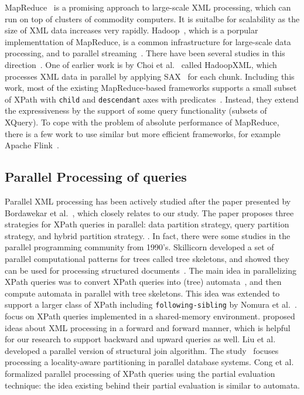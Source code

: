 MapReduce~\cite{DeGh04} is a promising approach to large-scale XML processing,
which can run on top of clusters of commodity computers. It is suitalbe for
scalability as the size of XML data increases very rapidly.
Hadoop~\cite{HadoopWhit12}, which is a porpular implementtation of MapReduce, is
a common infrastructure for large-scale data processing, and to parallel
streaming~\cite{OgTP13,LiZZ17}. There have been several studies in this
direction~\cite{BCMU13,CFKL12,DaGP14,EmIm12,DaGP14,MaMi16}. One of earlier work
is by Choi et al.~\cite{CLKL12} called HadoopXML, which processes XML data in
parallel by applying SAX~\cite{sax} for each chunk. Including this work, most of
the existing MapReduce-based frameworks supports a small subset of XPath with
\texttt{child} and \texttt{descendant} axes with
predicates~\cite{CCMN15,AfDG15,DaGP14,DaGK14}. Instead, they extend the
expressiveness by the support of some query functionality (subsets of XQuery).
To cope with the problem of absolute performance of MapReduce, there is a few
work to use similar but more efficient frameworks, for example Apache
Flink~\cite{CCMN15}.


\subsection{Parallel Processing of queries}

Parallel XML processing has been actively studied after the paper presented by
Bordawekar et al.~\cite{BoLS09}, which closely relates to our study. The paper
proposes three strategies for XPath queries in parallel: data partition
strategy, query partition strategy, and hybrid partition strategy. . In fact,
there were some studies in the parallel programming community from 1990's.
Skillicorn developed a set of parallel computational patterns for trees called
tree skeletons, and showed they can be used for processing structured
documents~\cite{Skil97}. The main idea in parallelizing XPath queries was to
convert XPath queries into (tree) automata~\cite{comon2007tree}, and then
compute automata in parallel with tree skeletons. This idea was extended to
support a larger class of XPath including \texttt{following-sibling} by Nomura
et al.~\cite{NEMH07}. \cite{KrYa10,PLZC07,ZhPC10} focus on XPath queries
implemented in a shared-memory environment. \cite{AAHa11} proposed ideas about
XML processing in a forward and forward manner, which is helpful for our
research to support backward and upward queries as well. Liu et
al.~\cite{LFLQ08} developed a parallel version of structural join algorithm. The
study~\cite{ZaBS15} focuses processing a locality-aware partitioning in parallel
database systems. Cong et al.~\cite{CFKL12} formalized parallel processing of
XPath queries using the partial evaluation technique: the idea existing behind
their partial evaluation is similar to automata.

